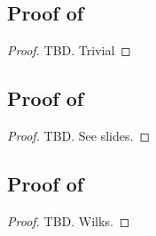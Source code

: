 \subsection{Proof of}
\begin{proof}
    TBD. Trivial
\end{proof}

    

\subsection{Proof of}
\begin{proof}
    TBD. See slides.
\end{proof}

\subsection{Proof of}
\begin{proof}
    TBD. Wilks.
\end{proof}


